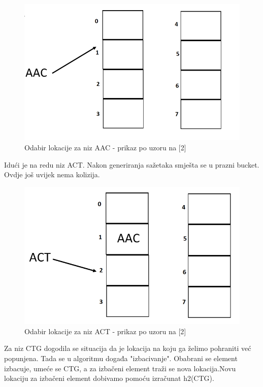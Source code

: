 \documentclass[times, utf8, seminar, numeric]{fer}
\begin{document}
\begin{figure}[H]
  \centering
  \setlength{\intextsep}{5pt}
  \includegraphics[scale = 0.4]{images/insertion1.png}
  \caption{Odabir lokacije za niz AAC - prikaz po uzoru na [2]}
  \label{fig_insert1}
\end{figure}
Idući je na redu niz ACT. Nakon generiranja sažetaka smješta se u prazni bucket. Ovdje još uvijek nema kolizija.
\begin{figure}[H]
  \centering
  \setlength{\intextsep}{5pt}
  \includegraphics[scale = 0.4]{images/insertion2.png}
  \caption{Odabir lokacije za niz ACT - prikaz po uzoru na [2]}
  \label{fig_insert2}
\end{figure}
Za niz CTG dogodila se situacija da je lokacija na koju ga želimo pohraniti već popunjena. Tada se u algoritmu događa "izbacivanje". Obabrani se element izbacuje, umeće se CTG, a za izbačeni element traži se nova lokacija.Novu lokaciju za izbačeni element dobivamo pomoću izračunat h2(CTG).
\end{document}
